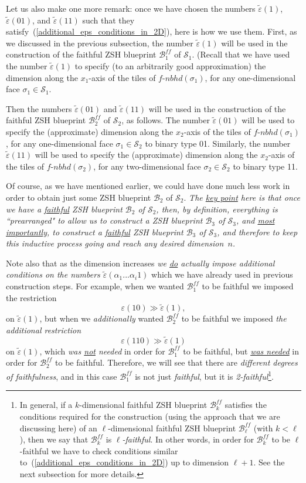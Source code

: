 \documentclass[12pt,letterpaper]{article}
\renewcommand{\S}{\mathcal{S}}
\newcommand{\B}{\mathcal{B}}
\newcommand{\eps}{\varepsilon}
\newcommand{\et}{\tilde\eps}
\newcommand{\nbhd}{\mathit{nbhd}}
\renewcommand{\a}{\alpha}
\begin{document}
\bigskip

Let us also make one more remark: once we have chosen the numbers $\et(1)$, $\et(01)$, and $\et(11)$ such that they satisfy~(\ref{additional_eps_conditions_in_2D}), here is how we use them. First, as we discussed in the previous subsection, the number $\et(1)$ will be used in the construction of the faithful ZSH blueprint $\B_1^\mathit{ff}$ of $\S_1$. (Recall that we have used the number $\et(1)$ to specify (to an arbitrarily good approximation) the dimension along the $x_1$-axis of the tiles of $f$-$\nbhd(\sigma_1)$, for any one-dimensional face $\sigma_1 \in \S_1$.

Then the numbers $\et(01)$ and $\et(11)$ will be used in the construction of the faithful ZSH blueprint $\B_2^\mathit{ff}$ of $\S_2$, as follows. The number $\et(01)$ will be used to specify the (approximate) dimension along the $x_2$-axis of the tiles of $f$-$\nbhd(\sigma_1)$, for any one-dimensional face $\sigma_1 \in \S_2$ to binary type 01.
Similarly, the number $\et(11)$ will be used to specify the (approximate) dimension along the $x_2$-axis of the tiles of $f$-$\nbhd(\sigma_2)$, for any two-dimensional face $\sigma_2 \in \S_2$ to binary type 11. 

Of course, as we have mentioned earlier, we could have done much less work in order to obtain just some ZSH blueprint $\B_2$ of $\S_2$. {\em The \ul{key point} here is that once we have a \ul{faithful} ZSH blueprint $\B_2$ of $\S_2$, then, by definition, everything is ``prearranged"  to allow us to construct a  ZSH blueprint $\B_3$ of $\S_3$, and \ul{most importantly}, to construct a \ul{faithful}  ZSH blueprint $\B_3$ of $\S_3$, and therefore to keep this inductive process going and reach any desired dimension~$n$.}

Note also that as the dimension increases {\em we \ul{do} actually  impose additional conditions on the numbers $\et(\a_1...\a_i 1)$} which we have already used in previous construction steps. For example, when we wanted  $\B_1^\mathit{ff}$ to be faithful  we imposed the restriction
$$ 
\eps(10) \gg \et(1),
$$
on $\et(1)$, but when we {\em additionally} wanted  $\B_2^\mathit{ff}$ to be faithful  we  imposed {\em the additional restriction} 
$$ 
\eps(110) \gg \et(1)
$$
on $\et(1)$, which  {\em was \ul{not} needed} in order for $\B_1^\mathit{ff}$ to be faithful, but \ul{\em was  needed} in order for $\B_2^\mathit{ff}$ to be faithful. Therefore, we will see that there are {\em different degrees of faithfulness}, and in this case $\B_1^\mathit{ff}$ is not just {\em faithful}, but it is {\em 2-faithful}\footnote{In general, if a $k$-dimensional faithful ZSH blueprint $\B_k^\mathit{ff}$ satisfies the conditions required for the construction (using the approach that we are discussing here) of an $\ell$-dimensional faithful ZSH blueprint $\B_\ell^\mathit{ff}$ (with $k < \ell$), then we say that $\B_k^\mathit{ff}$ is {\em $\ell$-faithful}. In other words, in order for $\B_k^\mathit{ff}$ to be $\ell$-faithful we have to check conditions similar to~(\ref{additional_eps_conditions_in_2D}) up to dimension $\ell+1$. See the next subsection for more details.}.
\end{document}
